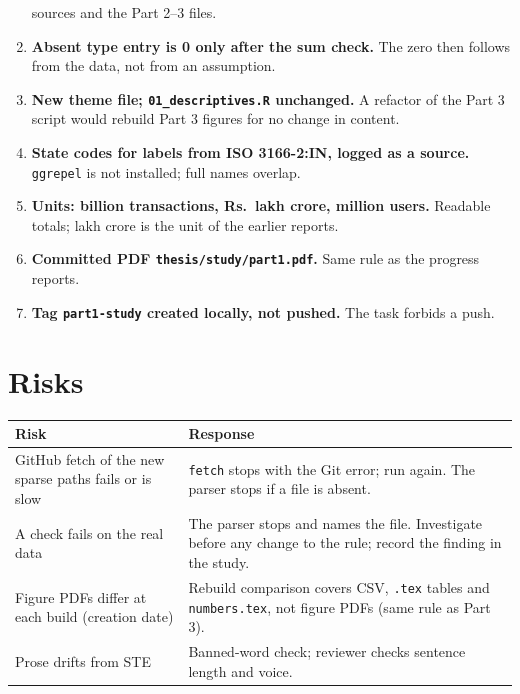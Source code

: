 \documentclass[11pt,a4paper]{article}
\newcommand{\f}[1]{\texttt{#1}}
\begin{document}
\begin{enumerate}
        sources and the Part 2--3 files.
  \item \textbf{Absent type entry is 0 only after the sum check.} The zero then follows from the data,
        not from an assumption.
  \item \textbf{New theme file; \f{01\_descriptives.R} unchanged.} A refactor of the Part 3 script
        would rebuild Part 3 figures for no change in content.
  \item \textbf{State codes for labels from ISO 3166-2:IN, logged as a source.} \f{ggrepel} is not
        installed; full names overlap.
  \item \textbf{Units: billion transactions, Rs.\ lakh crore, million users.} Readable totals;
        lakh crore is the unit of the earlier reports.
  \item \textbf{Committed PDF \f{thesis/study/part1.pdf}.} Same rule as the progress reports.
  \item \textbf{Tag \f{part1-study} created locally, not pushed.} The task forbids a push.
\end{enumerate}

\section{Risks}
\begin{tabularx}{\textwidth}{@{}Y Y@{}}
\toprule
Risk & Response \\
\midrule
GitHub fetch of the new sparse paths fails or is slow & \f{fetch} stops with the Git error; run again.
  The parser stops if a file is absent. \\
A check fails on the real data & The parser stops and names the file. Investigate before any change to
  the rule; record the finding in the study. \\
Figure PDFs differ at each build (creation date) & Rebuild comparison covers CSV, \f{.tex} tables and
  \f{numbers.tex}, not figure PDFs (same rule as Part 3). \\
Prose drifts from STE & Banned-word check; reviewer checks sentence length and voice. \\
\bottomrule
\end{tabularx}
\end{document}
